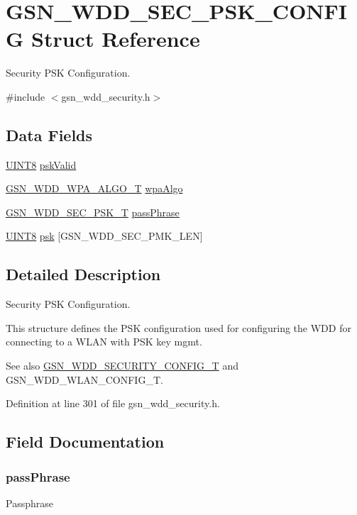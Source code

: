 \hypertarget{a00294}{
\section{GSN\_\-WDD\_\-SEC\_\-PSK\_\-CONFIG Struct Reference}
\label{a00294}
}


Security PSK Configuration.  




{\ttfamily \#include $<$gsn\_\-wdd\_\-security.h$>$}

\subsection*{Data Fields}
\begin{DoxyCompactItemize}
\item 
\hyperlink{a00660_gab27e9918b538ce9d8ca692479b375b6a}{UINT8} \hyperlink{a00294_ab199f55484c9f551020b3597b0c425d9}{pskValid}
\item 
\hyperlink{a00604_ae6d4a101986255ba5cb98e42ff3fb2ef}{GSN\_\-WDD\_\-WPA\_\-ALGO\_\-T} \hyperlink{a00294_a8e715bc8b16734e3b5fdd9a48babf510}{wpaAlgo}
\item 
\hyperlink{a00293}{GSN\_\-WDD\_\-SEC\_\-PSK\_\-T} \hyperlink{a00294_aab2ae6d49fb9cbf6a6ff1fa6af6ba6f7}{passPhrase}
\item 
\hyperlink{a00660_gab27e9918b538ce9d8ca692479b375b6a}{UINT8} \hyperlink{a00294_ad208e97270b561511a07b99d36718945}{psk} \mbox{[}GSN\_\-WDD\_\-SEC\_\-PMK\_\-LEN\mbox{]}
\end{DoxyCompactItemize}


\subsection{Detailed Description}
Security PSK Configuration. 

This structure defines the PSK configuration used for configuring the WDD for connecting to a WLAN with PSK key mgmt. \begin{DoxySeeAlso}{See also}
\hyperlink{a00604_ab50f348fec494c964d4301472eee16de}{GSN\_\-WDD\_\-SECURITY\_\-CONFIG\_\-T} and GSN\_\-WDD\_\-WLAN\_\-CONFIG\_\-T. 
\end{DoxySeeAlso}


Definition at line 301 of file gsn\_\-wdd\_\-security.h.



\subsection{Field Documentation}
\hypertarget{a00294_aab2ae6d49fb9cbf6a6ff1fa6af6ba6f7}{
\subsubsection[{passPhrase}]{ {\bf passPhrase}}}
\label{a00294_aab2ae6d49fb9cbf6a6ff1fa6af6ba6f7}
Passphrase 

